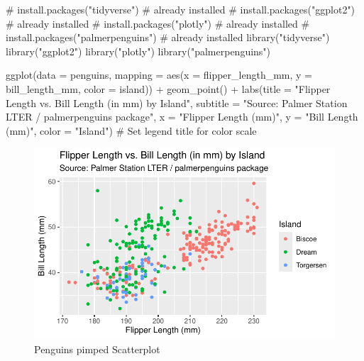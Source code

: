 \documentclass[
  letterpaper,
  DIV=11,
  numbers=noendperiod]{scrartcl}
\newenvironment{Shaded}{\begin{snugshade}}{\end{snugshade}}
\newcommand{\AttributeTok}[1]{\textcolor[rgb]{0.40,0.45,0.13}{#1}}
\newcommand{\CommentTok}[1]{\textcolor[rgb]{0.37,0.37,0.37}{#1}}
\newcommand{\FunctionTok}[1]{\textcolor[rgb]{0.28,0.35,0.67}{#1}}
\newcommand{\NormalTok}[1]{\textcolor[rgb]{0.00,0.23,0.31}{#1}}
\newcommand{\SpecialCharTok}[1]{\textcolor[rgb]{0.37,0.37,0.37}{#1}}
\newcommand{\StringTok}[1]{\textcolor[rgb]{0.13,0.47,0.30}{#1}}
\begin{document}
\begin{Shaded}
\begin{Highlighting}[]
\CommentTok{\# install.packages("tidyverse") \# already installed}
\CommentTok{\# install.packages("ggplot2") \# already installed}
\CommentTok{\# install.packages("plotly") \# already installed}
\CommentTok{\# install.packages("palmerpenguins") \# already installed}
\FunctionTok{library}\NormalTok{(}\StringTok{"tidyverse"}\NormalTok{)}
\FunctionTok{library}\NormalTok{(}\StringTok{"ggplot2"}\NormalTok{)}
\FunctionTok{library}\NormalTok{(}\StringTok{"plotly"}\NormalTok{)}
\FunctionTok{library}\NormalTok{(}\StringTok{"palmerpenguins"}\NormalTok{)}

\FunctionTok{ggplot}\NormalTok{(}\AttributeTok{data =}\NormalTok{ penguins,}
       \AttributeTok{mapping =} \FunctionTok{aes}\NormalTok{(}\AttributeTok{x =}\NormalTok{ flipper\_length\_mm, }
                     \AttributeTok{y =}\NormalTok{ bill\_length\_mm, }
                     \AttributeTok{color =}\NormalTok{ island)) }\SpecialCharTok{+} 
  \FunctionTok{geom\_point}\NormalTok{() }\SpecialCharTok{+}
  \FunctionTok{labs}\NormalTok{(}\AttributeTok{title =} \StringTok{"Flipper Length vs. Bill Length (in mm) by Island"}\NormalTok{,}
       \AttributeTok{subtitle =} \StringTok{"Source: Palmer Station LTER / palmerpenguins package"}\NormalTok{,}
          \AttributeTok{x =} \StringTok{"Flipper Length (mm)"}\NormalTok{, }\AttributeTok{y =} \StringTok{"Bill Length (mm)"}\NormalTok{,}
       \AttributeTok{color =} \StringTok{"Island"}\NormalTok{) }\CommentTok{\# Set legend title for color scale }
\end{Highlighting}
\end{Shaded}

\begin{figure}[H]

{\centering \includegraphics{Part1_Lecture1_Ex_files/figure-pdf/fig-penguins-pimped-scatterplot-1.pdf}

}

\caption{\label{fig-penguins-pimped-scatterplot}Penguins pimped
Scatterplot}

\end{figure}
\end{document}
